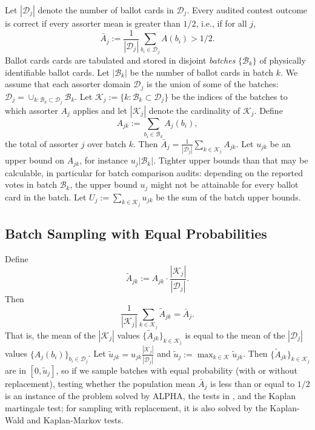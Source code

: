 \documentclass[aoas]{imsart}
\newcommand{\cB}{\ensuremath{\mathcal{B}}}
\newcommand{\cD}{\ensuremath{\mathcal{D}}}
\newcommand{\mc}[1]{\ensuremath{\mathcal{#1}}}
\begin{document}
Let $|\cD_j|$ denote the number of ballot cards in $\cD_j$.
Every audited contest outcome is correct if every assorter mean is greater than $1/2$, i.e., if for all $j$,
\begin{equation}
    \bar{A}_j := \frac{1}{|\cD_j|} \sum_{b_i \in \cD_j } A(b_i) > 1/2.
\end{equation}
Ballot cards cards are tabulated and stored in disjoint \emph{batches}
$\{ \cB_k \}$ of physically identifiable ballot cards.
Let $|\cB_k|$ be the number of ballot cards in batch $k$.
We assume that each assorter domain $\cD_j$ is the union of some of the batches:
$\cD_j = \cup_{k: \cB_k \subset \cD_j} \cB_k$.
Let $\mc{K}_j  := \{k: \cB_k \subset \cD_j\}$ be the indices of the batches to which assorter $A_j$ applies
and let $|\mc{K}_j|$ denote the cardinality of $\mc{K}_j$.
Define
\begin{equation}
   A_{jk} := \sum_{b_i \in \cB_k} A_j(b_i),
\end{equation}
the total of assorter $j$ over batch $k$.
Then $ \bar{A}_j = \frac{1}{|\cD_j|} \sum_{k \in \mc{K}_j} A_{jk}$.
Let $u_{jk}$ be an upper bound on $A_{jk}$, for instance $u_j |\cB_k|$.
Tighter upper bounds than that may be calculable, in particular for batch comparison audits:
depending on the reported votes in batch $\cB_k$, the upper bound $u_j$ might not be attainable for every ballot card
in the batch.
Let $U_j := \sum_{k \in \mc{K}_j} u_{jk}$ be the sum of the batch upper bounds.

\subsection{Batch Sampling with Equal Probabilities}

Define
\begin{equation}
    \widetilde{A}_{jk} := A_{jk} \cdot \frac{|\mc{K}_j|}{|\cD_j|}.
\end{equation}
Then
\begin{equation}
    \frac{1}{|\mc{K}_j|} \sum_{k \in \mc{K}_j} \widetilde{A}_{jk} =  \bar{A}_j.
\end{equation}
That is, the mean of the $|\mc{K}_j|$ values $\{ \widetilde{A}_{jk}\}_{k \in \mc{K}_j}$ is equal to
the mean of the $|\cD_j|$ values $\{A_j(b_i)\}_{b_i \in \cD_j}$.
Let $\widetilde{u}_{jk} = u_{jk} \frac{|\mc{K}_j|}{|\cD_j|}$
and $\widetilde{u}_j := \max_{k \in \mc{K}} \widetilde{u}_{jk}$.
Then $\{ \widetilde{A}_{jk} \}_{k \in \mc{K}_j}$ are in $[0, \widetilde{u}_j]$, so
if we sample batches with equal probability (with or without replacement), testing whether the population mean $\bar{A}_{j}$
is less than or equal to $1/2$ is an instance of the problem solved by ALPHA,
the tests in \citet{waudby-smithRamdas21,waudby-smithEtal21}, and the Kaplan martingale test;
for sampling with replacement, it is also solved by the Kaplan-Wald and Kaplan-Markov tests.
\end{document}

